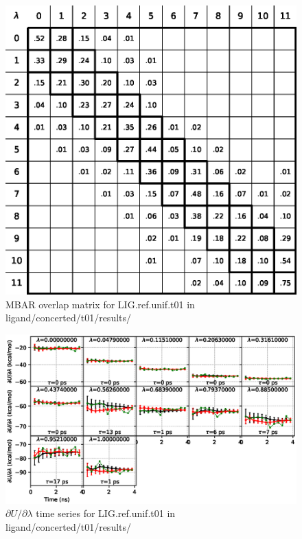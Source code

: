 \documentclass[journal=jctcce,manuscript=article,hyperref=false]{achemso}
\begin{document}
\begin{figure}
\includegraphics[clip,width=6in]{ligand.concerted.t01.results..S.eps}\vspace{-0.3cm}
\caption{MBAR overlap matrix for LIG.ref.unif.t01 in ligand/concerted/t01/results/}
\end{figure}


\begin{figure}
\includegraphics[clip,width=6in]{ligand.concerted.t01.results..DVDLvsT.eps}\vspace{-0.3cm}
\caption{$\partial U/\partial\lambda$ time series for LIG.ref.unif.t01 in ligand/concerted/t01/results/}
\end{figure}
\end{document}
